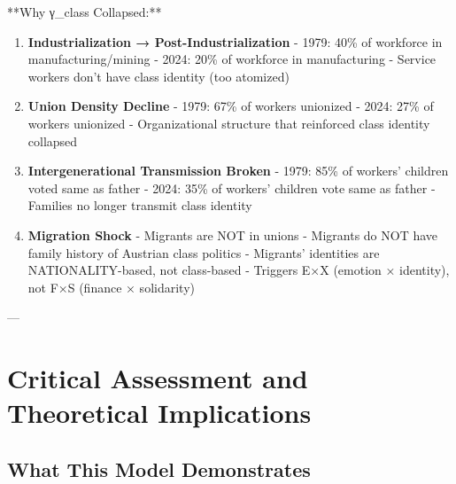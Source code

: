{{{{{{{{**Why γ_class Collapsed:**

\begin{enumerate}

\item \textbf{Industrialization → Post-Industrialization}
   - 1979: 40\% of workforce in manufacturing/mining
   - 2024: 20\% of workforce in manufacturing
   - Service workers don't have class identity (too atomized)

\item \textbf{Union Density Decline}
   - 1979: 67\% of workers unionized
   - 2024: 27\% of workers unionized
   - Organizational structure that reinforced class identity collapsed

\item \textbf{Intergenerational Transmission Broken}
   - 1979: 85\% of workers' children voted same as father
   - 2024: 35\% of workers' children vote same as father
   - Families no longer transmit class identity

\item \textbf{Migration Shock}
   - Migrants are NOT in unions
   - Migrants do NOT have family history of Austrian class politics
   - Migrants' identities are NATIONALITY-based, not class-based
   - Triggers E×X (emotion × identity), not F×S (finance × solidarity)

\end{enumerate}

---

\clearpage


\section{Critical Assessment and Theoretical Implications}
\label{sec:critical}

\subsection{What This Model Demonstrates}

\begin{tcolorbox}[colback=green!5!white, colframe=green!75!black,
    title=Strengths of SPÖ Temporal Model]

\begin{enumerate}


\end{enumerate}
\end{tcolorbox}}}}}}}}}
